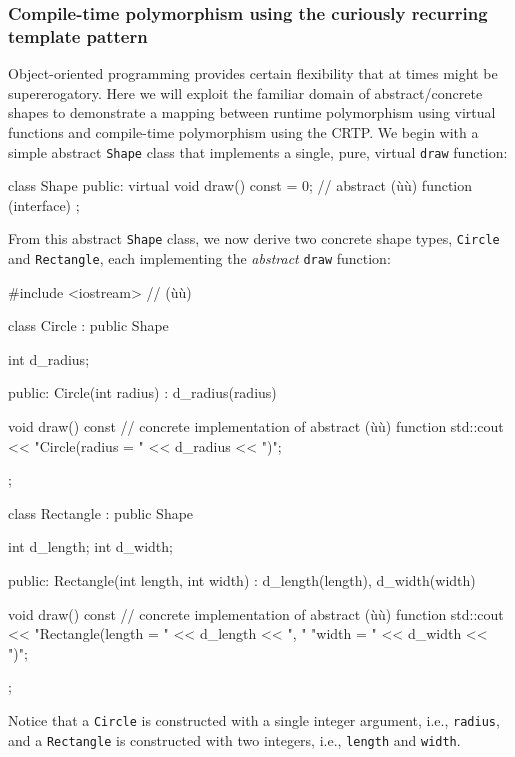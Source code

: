 \subsubsection[Compile-time polymorphism using the curiously recurring template pattern]{Compile-time polymorphism using the curiously recurring template pattern}\label{compile-time-polymorphism-using-crtp}

Object-oriented programming provides certain flexibility that at times
might be supererogatory. Here we will exploit the familiar domain of
abstract/concrete shapes to demonstrate a mapping between runtime
polymorphism using virtual functions and compile-time polymorphism using
the CRTP. We begin with a simple abstract \lstinline!Shape! class that
implements a single, pure, virtual \lstinline!draw! function:

\begin{emcppslisting}[emcppsbatch=e6]
class Shape
{
public:
    virtual void draw() const = 0;  // abstract (ù{}ù) function (interface)
};
\end{emcppslisting}
    
\noindent From this abstract \lstinline!Shape! class, we now derive two concrete
shape types, \lstinline!Circle! and \mbox{\lstinline!Rectangle!}, each implementing
the \emph{abstract} \lstinline!draw! function:

\begin{emcppslisting}[emcppsbatch=e6]
#include <iostream>  // (ù{}ù)

class Circle : public Shape
{
    int d_radius;

public:
    Circle(int radius) : d_radius(radius) { }

    void draw() const  // concrete implementation of abstract (ù{}ù) function
    {
        std::cout << "Circle(radius = " << d_radius << ")\n";
    }
};

class Rectangle : public Shape
{
    int d_length;
    int d_width;

public:
    Rectangle(int length, int width) : d_length(length), d_width(width) { }

    void draw() const  // concrete implementation of abstract (ù{}ù) function
    {
        std::cout << "Rectangle(length = " << d_length << ", "
                                "width = " << d_width  << ")\n";
    }
};
\end{emcppslisting}
    
\noindent Notice that a \lstinline!Circle! is constructed with a single integer
argument, i.e., \lstinline!radius!, and a \lstinline!Rectangle! is constructed
with two integers, i.e., \lstinline!length! and \lstinline!width!.


